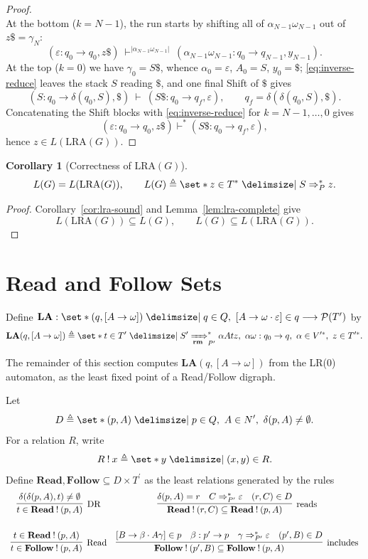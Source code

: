 \documentclass[11pt,a4paper]{article}
\theoremstyle{prettyplain}
\newtheorem{corollary}[theorem]{Corollary}
\theoremstyle{prettydef}
\def\mid{\;\delimsize\vert\;}#1%
\newcommand{\Pow}{\ensuremath{\mathcal P}}
\newcommand{\eps}{\varepsilon}
\newcommand{\LRA}{\mathrm{LRA}}
\newcommand{\RMP}{\xRightarrow[\mathbf{rm}]{}_{P^\prime}}
\newcommand{\DerP}{\Rightarrow_P}
\newcommand{\Path}[3]{#1:#2\to#3}
\newcommand{\Item}[2]{[#1\to #2]}
\newcommand{\Look}{\mathbf{LA}}
\newcommand{\Read}{\mathbf{Read}}
\newcommand{\Follow}{\mathbf{Follow}}
\begin{document}
\begin{proof}
\[\]
At the bottom (\(k=N-1\)), the run starts by shifting all of
\(\alpha_{N-1}\omega_{N-1}\) out of \(z\$=\gamma_N\):
\[
(\Path{\eps}{q_0}{q_0},z\$)
\ \vdash^{|\alpha_{N-1}\omega_{N-1}|}\
(\Path{\alpha_{N-1}\omega_{N-1}}{q_0}{q_{N-1}},y_{N-1}).
\]
At the top (\(k=0\)) we have \(\gamma_0=S\$\), whence \(\alpha_0=\eps\),
\(A_0=S\), \(y_0=\$\); \eqref{eq:inverse-reduce} leaves the stack \(S\) reading
\(\$\), and one final Shift of \(\$\) gives
\[
(\Path{S}{q_0}{\delta(q_0,S)},\$)
\ \vdash\
(\Path{S\$}{q_0}{q_f},\eps),
\qquad
q_f=\delta(\delta(q_0,S),\$).
\]
Concatenating the Shift blocks with \eqref{eq:inverse-reduce} for
\(k=N-1,\ldots,0\) gives
\[
(\Path{\eps}{q_0}{q_0},z\$)
\vdash^*
(\Path{S\$}{q_0}{q_f},\eps),
\]
hence \(z\in L(\LRA(G))\).
\end{proof}

\begin{corollary}[Correctness of \(\LRA(G)\)]\label{cor:lra-correct}
\[
L(G)=L(\LRA(G)),
\qquad
L(G)\triangleq\set*{z\in T^*\mid S\DerP^*z}.
\]
\end{corollary}

\begin{proof}
Corollary~\ref{cor:lra-sound} and Lemma~\ref{lem:lra-complete} give
\[
L(\LRA(G))\subseteq L(G),
\qquad
L(G)\subseteq L(\LRA(G)).
\]
\end{proof}

\section{Read and Follow Sets}

Define
\(
\Look:
\set*{(q,\Item{A}{\omega})
\mid q\in Q,\ \Item{A}{\omega\cdot\eps}\in q}
\longrightarrow \Pow(T^\prime)
\)
by
\begin{equation}\label{eq:la-def}
\Look(q,\Item{A}{\omega})
\triangleq
\set*{t\in T^\prime
\mid
S^\prime\RMP^*\alpha A t z,\
\Path{\alpha\omega}{q_0}{q},\
\alpha\in V^{\prime *},\
z\in T^{\prime *}}.
\end{equation}

The remainder of this section computes \(\Look(q,\Item{A}{\omega})\) from the
LR(0) automaton, as the least fixed point of a Read/Follow digraph.

Let
\[
D\triangleq
\set*{(p,A)\mid p\in Q,\ A\in N^\prime,\ \delta(p,A)\ne\emptyset}.
\]
For a relation \(R\), write
\[
R\mathbin{!}x\triangleq\set*{y\mid (x,y)\in R}.
\]
Define \(\Read,\Follow\subseteq D\times T^\prime\) as the least relations
generated by the rules
\[
\begin{array}{cc}
\infer[\mathrm{DR}]
  {t\in\Read\mathbin{!}(p,A)}
  {\delta(\delta(p,A),t)\ne\emptyset}
&
\infer[\mathrm{reads}]
  {\Read\mathbin{!}(r,C)\subseteq\Read\mathbin{!}(p,A)}
  {\delta(p,A)=r & C\Rightarrow_{P^\prime}^*\eps & (r,C)\in D}
\\[4ex]
\infer[\mathrm{Read}]
  {t\in\Follow\mathbin{!}(p,A)}
  {t\in\Read\mathbin{!}(p,A)}
&
\infer[\mathrm{includes}]
  {\Follow\mathbin{!}(p^\prime,B)\subseteq\Follow\mathbin{!}(p,A)}
  {\Item{B}{\beta\cdot A\gamma}\in p
   & \Path{\beta}{p^\prime}{p}
   & \gamma\Rightarrow_{P^\prime}^*\eps
   & (p^\prime,B)\in D}
\end{array}
\]
\end{document}
